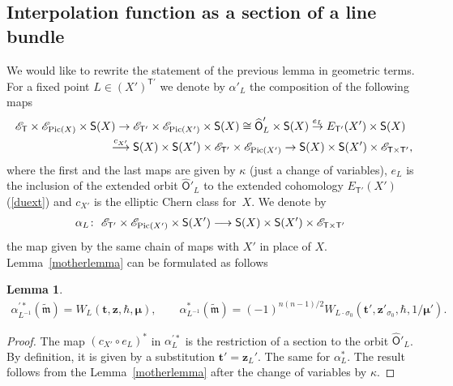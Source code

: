 \documentclass[10pt,a4paper]{amsart}
\newcommand{\bT}{\mathsf{T}}
\newcommand{\Or}{\textsf{O}}
\newcommand{\cE}{\mathscr{E}}
\def\ttt{{\boldsymbol t}}
\def\zz{{\boldsymbol z}}
\def\mub{{\boldsymbol\mu}}
\numberwithin{equation}{section}
\newtheorem{Lemma}[Theorem]{Lemma}
\begin{document}
\subsection{Interpolation function as a section of a line bundle}
We would like to rewrite the statement of the previous lemma in geometric terms.
For a fixed point $L \in (X')^{\bT'}$ we denote by $\alpha'_{L}$ the composition of the following maps
\begin{gather*}
\cE_{\bT}\times \cE_{{\rm Pic}(X)}\times \textsf{S}(X) \rightarrow \cE_{\bT'}\times \cE_{{\rm Pic}(X')}\times \textsf{S}(X)\cong \widehat{\Or}'_{L} \times \textsf{S}(X)
\stackrel{e_{L}}{\rightarrow} E_{\bT'}(X')\times \textsf{S}(X)\\
\hphantom{\cE_{\bT}\times \cE_{{\rm Pic}(X)}\times \textsf{S}(X)}{}
 \stackrel{c_{X'}}{\longrightarrow} \textsf{S}(X)\times \textsf{S}(X') \times \cE_{\bT'}\times \cE_{{\rm Pic}(X')}\rightarrow \textsf{S}(X)\times \textsf{S}(X') \times \cE_{\bT\times \bT'},
\end{gather*}
where the first and the last maps are given by $\kappa$ (just a change of variables), $e_{L}$ is the inclusion of the extended orbit $\widehat{\Or}'_{L}$ to the extended cohomology $E_{\bT'}(X')$ (\ref{duext}) and $c_{X'}$ is the elliptic Chern class for~$X$. We denote by
\begin{gather*}
\alpha_{L}\colon \ \cE_{\bT'}\times \cE_{{\rm Pic}(X')}\times \textsf{S}(X')\longrightarrow \textsf{S}(X)\times \textsf{S}(X') \times \cE_{\bT\times \bT'}
\end{gather*}
the map given by the same chain of maps with $X'$ in place of $X$. Lemma~\ref{motherlemma} can be formulated as follows
\begin{Lemma} \label{allem}
 \begin{gather*}
 \alpha^{'*}_{L^{-1}} (\tilde{\mathfrak{m}})= W_{L}(\ttt,\zz,\hbar,\mub), \qquad \alpha^{*}_{L^{-1}} (\tilde{\mathfrak{m}})=(-1)^{n(n-1)/2} W_{L\cdot\sigma_0}(\ttt',\zz'_{\sigma_0},\hbar,1/\mub').
 \end{gather*}
\end{Lemma}
\begin{proof} The map $(c_{X'} \circ e_L)^*$ in $\alpha^{'*}_{L}$ is the restriction of a section to the orbit $\widehat{\Or}'_{L}$. By definition, it is given by a substitution $\ttt'=\zz_{L}'$. The same for $\alpha^{*}_{L}$. The result follows from the Lemma~\ref{motherlemma} after the change of variables by $\kappa$.
\end{proof}
\end{document}
